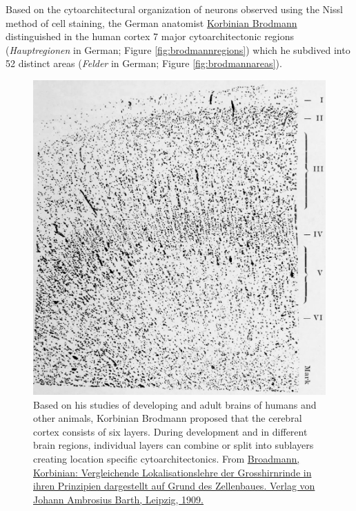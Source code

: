 Based on the cytoarchitectural organization of neurons observed using the Nissl method of cell staining, the German anatomist \href{https://en.wikipedia.org/wiki/Korbinian_Brodmann}{Korbinian Brodmann} distinguished in the human cortex 7 major cytoarchitectonic regions (\emph{Hauptregionen} in German; Figure \ref{fig:brodmannregions}) which he subdived into 52 distinct areas (\emph{Felder} in German; Figure \ref{fig:brodmannareas}).



\begin{figure}

{\centering \includegraphics[width=0.7\linewidth]{./figures/cns/cortex_area_5} 

}

\caption{Based on his studies of developing and adult brains of humans and other animals, Korbinian Brodmann proposed that the cerebral cortex consists of six layers. During development and in different brain regions, individual layers can combine or split into sublayers creating location specific cytoarchitectonics. From \href{https://wellcomelibrary.org/item/b28062449}{Broadmann, Korbinian: Vergleichende Lokalisationslehre der Grosshirnrinde in ihren Prinzipien dargestellt auf Grund des Zellenbaues. Verlag von Johann Ambrosius Barth, Leipzig, 1909.}}\label{fig:brodmannlayers}
\end{figure}



